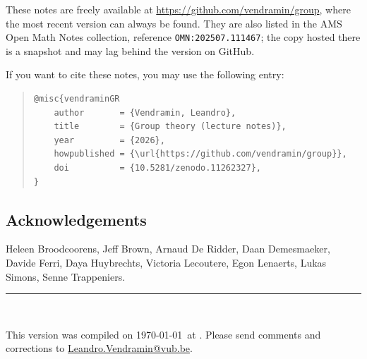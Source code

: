 These notes are freely available at \url{https://github.com/vendramin/group},
where the most recent version can always be found. They are also listed in the
AMS Open Math Notes collection, reference \texttt{OMN:202507.111467}; the copy
hosted there is a snapshot and may lag behind the version on GitHub.

If you want to cite these notes, you may use the following entry:

\vspace{1cm}
{\footnotesize
\begin{quote}
\begin{verbatim}
@misc{vendraminGR
    author       = {Vendramin, Leandro},
    title        = {Group theory (lecture notes)},
    year         = {2026},
    howpublished = {\url{https://github.com/vendramin/group}},
    doi          = {10.5281/zenodo.11262327},
}
\end{verbatim}
\end{quote}}
\vspace{.8cm}

\subsection*{Acknowledgements}

 Heleen Broodcoorens, 
 Jeff Brown, 
 Arnaud De Ridder,
 Daan\linebreak
 Demesmaeker, 
 Davide Ferri,
 Daya Huybrechts, 
 Victoria Lecoutere, 
 Egon Lenaerts, 
 Lukas Simons, 
 Senne Trappeniers. 
 
\vfill
\noindent\rule{\textwidth}{0.4pt}\\[2pt]
{\footnotesize\indent This version was compiled on \today\ at \currenttime.
Please send comments and corrections to
\href{mailto:Leandro.Vendramin@vub.be}{Leandro.Vendramin@vub.be}.\par}


